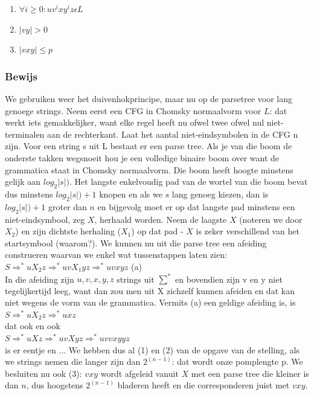 \documentclass{article}
\begin{document}
            \begin{enumerate}
                \item $\forall i \geq 0: uv^ixy^iz \epsilon L$
                \item $\vert vy \vert > 0$
                \item $\vert vxy \vert \leq p$
            \end{enumerate}

        \subsubsection{Bewijs}
            We gebruiken weer het duivenhokprincipe, maar nu op de parsetree voor lang genoege strings. Neem eerst een CFG in Chomsky normaalvorm voor $L$: dat werkt iets gemakkelijker, want elke regel heeft nu ofwel twee ofwel nul niet-terminalen aan de rechterkant. Laat het aantal niet-eindsymbolen in de CFG n zijn. Voor een string s uit L bestaat er een parse tree. Als je van die boom de onderste takken wegsnoeit hou je een volledige binaire boom over want de grammatica staat in Chomsky normaalvorm. Die boom heeft hoogte minstens gelijk aan $log_2\vert s \vert)$. Het langste enkelvoudig pad van de wortel van die boom bevat dus minstens $log_2\vert s \vert) + 1$ knopen en als we $s$ lang genoeg kiezen, dan is $log_2\vert s \vert) + 1$ groter dan $n$ en bijgevolg moet er op dat langste pad minstens een niet-eindsymbool, zeg $X$, herhaald worden. Neem de laagste $X$ (noteren we door $X_2$) en zijn dichtste herhaling ($X_1$) op dat pad - $X$ is zeker verschillend van het startsymbool (waarom?). We kunnen nu uit die parse tree een afeiding construeren waarvan we enkel wat tussenstappen laten zien: \\
            $S \Rightarrow^* uX_2z  \Rightarrow^* uvX_1yz  \Rightarrow^* uvxyz$ (a) \\
            In die afeiding zijn $u,v,x,y,z$ strings uit $\sum^*$ en bovendien zijn v en y niet tegelijkertijd leeg, want dan zou men uit X zichzelf kunnen afeiden en dat kan niet wegens de vorm van de grammatica. Vermits (a) een geldige afeiding is, is \\
            $S  \Rightarrow^* uX_2z  \Rightarrow^* uxz$\\
            dat ook en ook \\
            $S  \Rightarrow^* uXz  \Rightarrow^* uvXyz  \Rightarrow^* uvvxyyz$ \\
            is er eentje en ... We hebben dus al (1) en (2) van de opgave van de stelling, als we strings nemen die langer zijn dan $2^{(n-1)}$: dat wordt onze pomplengte p. We besluiten nu ook (3): $vxy$ wordt afgeleid vanuit $X$ met een parse tree die kleiner is dan $n$, dus hoogstens $2^{(n-1)}$ bladeren heeft en die corresponderen juist met $vxy$.
\end{document}
